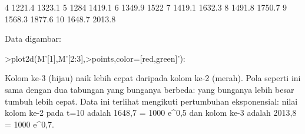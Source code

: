 \documentclass[a4paper,10pt]{article}
\begin{document}
\begin{eulernotebook}
\begin{eulercomment}
\begin{eulercomment}
\begin{eulercomment}
\begin{eulercomment}
\begin{eulercomment}
\begin{eulercomment}
\begin{eulercomment}
\begin{eulercomment}
\begin{eulercomment}
\begin{eulercomment}
\begin{eulercomment}
\begin{eulercomment}
\begin{eulercomment}
\begin{eulercomment}
\begin{eulercomment}
\begin{eulercomment}
\begin{eulercomment}
\begin{eulercomment}
\begin{eulercomment}
\begin{eulercomment}
\begin{eulercomment}
\begin{eulercomment}
\begin{eulercomment}
\begin{eulercomment}
\begin{eulercomment}
\begin{eulercomment}
\begin{euleroutput}
          4    1221.4    1323.1 
          5      1284    1419.1 
          6    1349.9      1522 
          7    1419.1    1632.3 
          8    1491.8    1750.7 
          9    1568.3    1877.6 
         10    1648.7    2013.8 
\end{euleroutput}
\begin{eulercomment}
Data digambar:
\end{eulercomment}
\begin{eulerprompt}
>plot2d(M'[1],M'[2:3],>points,color=[red,green]'):
\end{eulerprompt}
\begin{eulercomment}
Kolom ke-3 (hijau) naik lebih cepat daripada kolom ke-2 (merah). Pola seperti ini sama dengan
dua tabungan yang bunganya berbeda: yang bunganya lebih besar tumbuh lebih cepat. Data ini
terlihat mengikuti pertumbuhan eksponensial: nilai kolom ke-2 pada t=10 adalah 1648,7 =
1000 e\textasciicircum{}0,5 dan kolom ke-3 adalah 2013,8 = 1000 e\textasciicircum{}0,7.


\end{eulercomment}
\end{eulercomment}
\end{eulercomment}
\end{eulercomment}
\end{eulercomment}
\end{eulercomment}
\end{eulercomment}
\end{eulercomment}
\end{eulercomment}
\end{eulercomment}
\end{eulercomment}
\end{eulercomment}
\end{eulercomment}
\end{eulercomment}
\end{eulercomment}
\end{eulercomment}
\end{eulercomment}
\end{eulercomment}
\end{eulercomment}
\end{eulercomment}
\end{eulercomment}
\end{eulercomment}
\end{eulercomment}
\end{eulercomment}
\end{eulercomment}
\end{eulercomment}
\end{eulercomment}
\end{eulernotebook}
\end{document}
